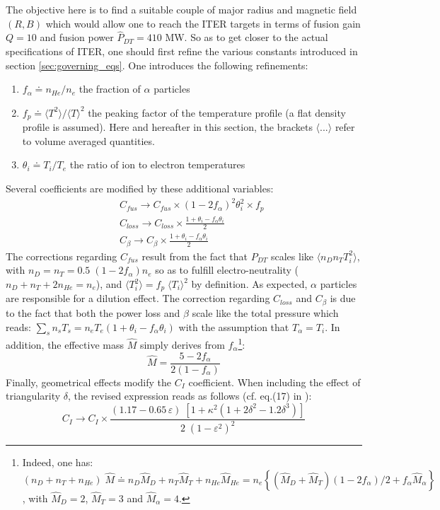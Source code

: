 The objective here is to find a suitable couple of major radius and magnetic field $(R,B)$ which would allow one to reach the ITER targets in terms of fusion gain $Q=10$ and fusion power $\hat P_{DT}=410$ MW.
So as to get closer to the actual specifications of ITER, one should first refine the various constants introduced in section \ref{sec:governing_eqs}. One introduces the following refinements:
\begin{enumerate}
    \item $f_\alpha \doteq n_{He}/n_e$ the fraction of $\alpha$ particles
    \item $f_p \doteq \langle T^2 \rangle / \langle T \rangle^2$ the peaking factor of the temperature profile (a flat density profile is assumed). Here and hereafter in this section, the brackets $\langle ...\rangle$ refer to volume averaged quantities.
    \item $\theta_i \doteq T_i/T_e$ the ratio of ion to electron temperatures
\end{enumerate}
Several coefficients are modified by these additional variables:
\begin{eqnarray*}
    && C_{fus} \to C_{fus} \times (1-2f_\alpha)^2\theta_i^2 \times f_p \\
    && C_{loss} \to C_{loss} \times \frac{1+\theta_i - f_\alpha\theta_i}{2}  \\
    && C_\beta \to C_\beta \times \frac{1+\theta_i - f_\alpha\theta_i}{2}
\end{eqnarray*}
The corrections regarding $C_{fus}$ result from the fact that $P_{DT}$ scales like $\langle n_Dn_TT_i^2 \rangle$, with $n_D = n_T = 0.5\; (1-2f_\alpha)n_e$ so as to fulfill electro-neutrality ($n_D+n_T+2n_{He}=n_e$), and $\langle T_i^2 \rangle = f_p\; \langle T_i \rangle^2$ by definition. As expected, $\alpha$ particles are responsible for a dilution effect. The correction regarding $C_{loss}$ and $C_\beta$ is due to the fact that both the power loss and $\beta$ scale like the total pressure which reads: $\sum_s n_sT_s = n_eT_e (1+\theta_i- f_\alpha \theta_i)$ with the assumption that $T_\alpha=T_i$.
In addition, the effective mass $\hat M$ simply derives from $f_\alpha$\footnote{Indeed, one has: $(n_D+n_T+n_{He})\; \hat M \doteq n_D\hat M_D + n_T\hat M_T + n_{He}\hat M_{He} =
n_e\left\{ (\hat M_D + \hat M_T)(1-2f_\alpha)/2 + f_\alpha \hat M_\alpha \right\}$, with $\hat M_D=2$, $\hat M_T=3$ and $\hat M_\alpha=4$.}:
\begin{equation*}
    \hat M = \frac{5  - 2f_\alpha}{2(1-f_\alpha)}
\end{equation*}
Finally, geometrical effects modify the $C_I$ coefficient. When including the effect of triangularity $\delta$, the revised expression reads as follows (cf. eq.(17) in \cite{Johner2011}):
\begin{equation*}
    C_I \to C_I \times 
    \frac{(1.17-0.65\, \varepsilon)\; \left[ 1+\kappa^2(1+2\delta^2-1.2\delta^3) \right]} {2\;(1-\varepsilon^2)^2}
\end{equation*}

